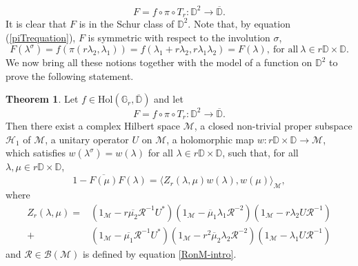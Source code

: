 \documentclass[12pt,reqno]{amsart}
\numberwithin{equation}{section}
\theoremstyle{definition}
\newtheorem{thm}[equation]{Theorem}
\begin{document}
\begin{equation}\label{F=fpiTr}
 F = f \circ \pi \circ T_{r} : \mathbb{D}^{2} \to \overline{\mathbb{D}}.
 \end{equation}
It  is clear  that $F$ is in the Schur class of $\mathbb{D}^{2}$. Note that, by equation (\ref{piTrequation}), $F$ is symmetric with respect to the involution $\sigma$,
\begin{equation}\label{Finvolution}
 F(\lambda^{\sigma}) = f(\pi(r\lambda_{2},\lambda_{1})) = f(\lambda_{1}+r\lambda_{2},r\lambda_{1}\lambda_{2}) = F(\lambda), \ \text{for all} \
  \lambda \in  r\mathbb{D}\times\mathbb{D}.
\end{equation}
We now bring all these notions together with the model of a function on $\mathbb{D}^{2}$ to prove the following statement.
\begin{thm}\label{modelformulaforGr}
Let $f\in \mathrm{Hol}(\mathbb{G}_{r},\overline{\mathbb{D}})$ and let 
$$F = f \circ \pi \circ T_{r}: \mathbb{D}^{2} \to \overline{\mathbb{D}}.$$ Then 
there exist a complex Hilbert space $\mathcal{M}$,  a closed non-trivial proper subspace  $\mathcal{H}_{1}$ of $\mathcal{M}$,
a unitary operator $U$ on $\mathcal{M}$, 
 a holomorphic map $w: r\mathbb{D}\times \mathbb{D} \to \mathcal{M}$, which satisfies $w(\lambda^{\sigma}) = w(\lambda)$ for all $\lambda \in r\mathbb{D}\times\mathbb{D}$,   such that, for all $\lambda, \mu \in r\mathbb{D}\times\mathbb{D}$, 
\begin{equation}\label{Zrinnerproduct}
1-\overline{F(\mu)}F(\lambda) = \langle Z_{r}(\lambda,\mu)w(\lambda),w(\mu) \rangle_{\mathcal{M}}, 
\end{equation}
where
\begin{align*}
Z_{r}(\lambda,\mu) =& (1_{\mathcal{M}}-r\overline{\mu_{2}}\mathcal{R}^{-1}U^{*})(1_{\mathcal{M}}-  \overline{\mu}_{1}\lambda_{1}\mathcal{R}^{-2})(1_{\mathcal{M}}-r\lambda_{2}U\mathcal{R}^{-1}) \nonumber \\
+ & (1_{\mathcal{M}}-\overline{\mu_{1}}\mathcal{R}^{-1}U^{*})(1_{\mathcal{M}}-r^{2} \overline{\mu}_{2}\lambda_{2}\mathcal{R}^{-2})(1_{\mathcal{M}}-\lambda_{1}U\mathcal{R}^{-1})
\end{align*}
and $\mathcal{R}\in\mathcal{B(M)}$ is defined by equation \eqref{RonM-intro}.
\end{thm}
\end{document}
